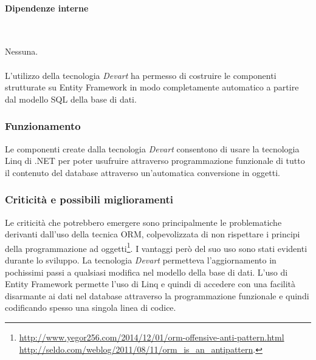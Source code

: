 \documentclass[../RelazioneFinale.tex]{subfiles}
\begin{document}
				\paragraph{Dipendenze interne} \ \par
					Nessuna.
				
				
				\paragraph{}
					L'utilizzo della tecnologia \emph{Devart} ha permesso di costruire le componenti strutturate su Entity Framework in modo completamente automatico a partire dal modello SQL della base di dati.
			
			\subsubsection{Funzionamento}
				Le componenti create dalla tecnologia \emph{Devart} consentono di usare la tecnologia Linq di .NET per poter usufruire attraverso programmazione funzionale di tutto il contenuto del database attraverso un'automatica conversione in oggetti.
			
			
			\subsubsection{Criticità e possibili miglioramenti}
				Le criticità che potrebbero emergere sono principalmente le problematiche derivanti dall'uso della tecnica ORM, colpevolizzata di non rispettare i principi della programmazione ad oggetti\footnote{\url{http://www.yegor256.com/2014/12/01/orm-offensive-anti-pattern.html} \\ \url{http://seldo.com/weblog/2011/08/11/orm_is_an_antipattern}.}.
				I vantaggi però del suo uso sono stati evidenti durante lo sviluppo. La tecnologia \emph{Devart} permetteva l'aggiornamento in pochissimi passi a qualsiasi modifica nel modello della base di dati. L'uso di Entity Framework permette l'uso di Linq e quindi di accedere con una facilità disarmante ai dati nel database attraverso la programmazione funzionale e quindi codificando spesso una singola linea di codice.
				
\end{document}

